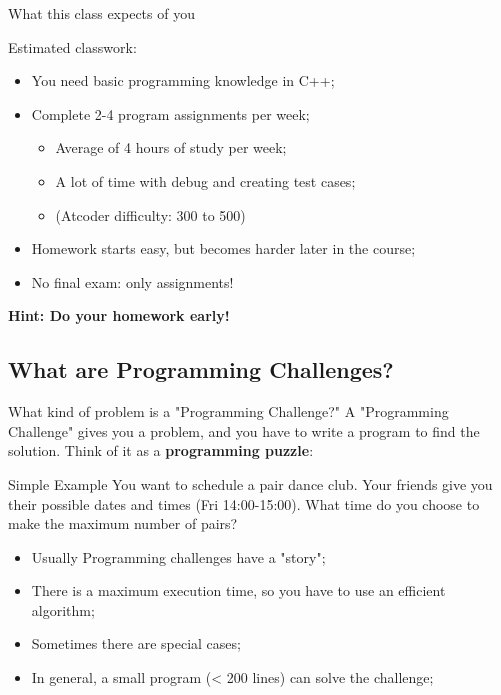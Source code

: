\begin{frame}{What this class expects of you}
  \begin{exampleblock}{Estimated classwork:}
    \begin{itemize}
      \item You need basic programming knowledge in C++;
      \medskip

      \item Complete 2-4 program assignments per week;
      \begin{itemize}
        \item Average of 4 hours of study per week;
        \item A lot of time with debug and creating test cases;
        \item (Atcoder difficulty: 300 to 500)
      \end{itemize}
      \medskip

      \item Homework starts easy, but becomes harder later in the course;
      \medskip

      \item No final exam: only assignments!
    \end{itemize}
  \end{exampleblock}
  \hfill {\bf Hint: Do your homework early!}
\end{frame}

\subsection{What are Programming Challenges?}
\begin{frame}{What kind of problem is a "Programming Challenge?"}
  A "Programming Challenge" gives you a problem, and you have to write a program to find the solution. Think of it as a {\bf programming puzzle}:

  \begin{block}{Simple Example}
    You want to schedule a pair dance club. Your friends give you their possible dates and times (Fri 14:00-15:00). What time do you choose to make the maximum number of pairs?
  \end{block}
  \bigskip

  \begin{itemize}
    \item Usually Programming challenges have a "story";
    \item There is a maximum execution time, so you have to use an efficient algorithm;
    \item Sometimes there are special cases;
    \item In general, a small program (< 200 lines) can solve the challenge;
  \end{itemize}
\end{frame}



